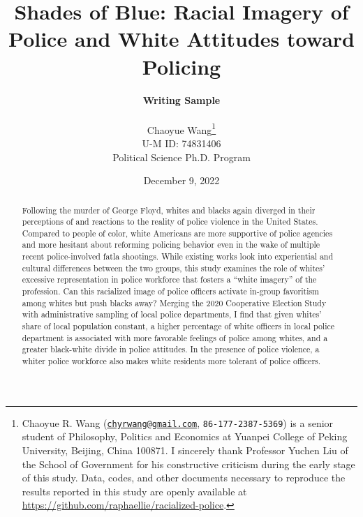 \documentclass[
  12pt,
]{article}
\title{\textbf{Shades of Blue: Racial Imagery of Police and White
Attitudes toward Policing}}
\author{\textbf{\large Writing Sample} \\ \\ Chaoyue Wang\footnote{Chaoyue R. Wang
  (\href{mailto:chyrwang@gmail.com}{\nolinkurl{chyrwang@gmail.com}},
  \texttt{86-177-2387-5369}) is a senior student of Philosophy, Politics
  and Economics at Yuanpei College of Peking University, Beijing, China
  100871. I sincerely thank Professor Yuchen Liu of the School of
  Government for his constructive criticism during the early stage of
  this study. Data, codes, and other documents necessary to reproduce
  the results reported in this study are openly available at
  \url{https://github.com/raphaellie/racialized-police}.} \\ U-M ID: 74831406 \\ Political Science Ph.D. Program}
\date{December 9, 2022}
\begin{document}


\maketitle


\thispagestyle{empty}

\begin{abstract} 
\noindent %
Following the murder of George Floyd, whites and blacks again diverged
in their perceptions of and reactions to the reality of police violence
in the United States. Compared to people of color, white Americans are
more supportive of police agencies and more hesitant about reforming
policing behavior even in the wake of multiple recent police-involved
fatla shootings. While existing works look into experiential and
cultural differences between the two groups, this study examines the
role of whites' excessive representation in police workforce that
fosters a ``white imagery'' of the profession. Can this racialized image
of police officers activate in-group favoritism among whites but push
blacks away? Merging the 2020 Cooperative Election Study with
administrative sampling of local police departments, I find that given
whites' share of local population constant, a higher percentage of white
officers in local police department is associated with more favorable
feelings of police among whites, and a greater black-white divide in
police attitudes. In the presence of police violence, a whiter police
workforce also makes white residents more tolerant of police officers.
\end{abstract}

\begin{quote}
\end{quote}

\newpage \clearpage {}\captionsetup{labelfont = bf, font = small}




\ifdefined\Shaded\renewenvironment{Shaded}{\begin{tcolorbox}[borderline west={3pt}{0pt}{shadecolor}, enhanced, boxrule=0pt, breakable, sharp corners, interior hidden, frame hidden]}{\end{tcolorbox}}\fi
\end{document}
